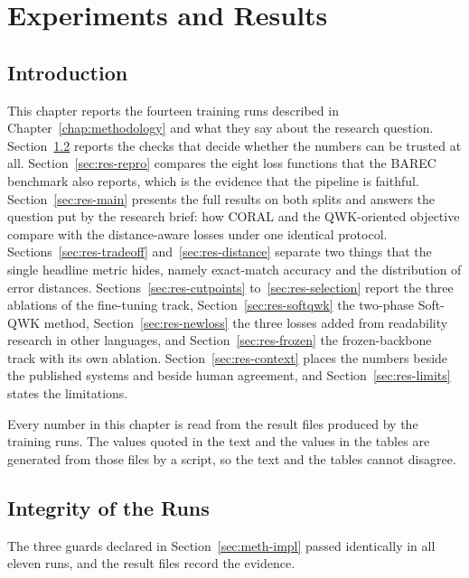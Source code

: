 \chapter{Experiments and Results}
\label{chap:results}

\section{Introduction}

This chapter reports the fourteen training runs described in Chapter~\ref{chap:methodology} and
what they say about the research question. Section~\ref{sec:res-integrity} reports the checks
that decide whether the numbers can be trusted at all. Section~\ref{sec:res-repro} compares the
eight loss functions that the BAREC benchmark also reports, which is the evidence that the
pipeline is faithful. Section~\ref{sec:res-main} presents the full results on both splits and
answers the question put by the research brief: how CORAL and the QWK-oriented objective
compare with the distance-aware losses under one identical protocol.
Sections~\ref{sec:res-tradeoff} and~\ref{sec:res-distance} separate two things that the single
headline metric hides, namely exact-match accuracy and the distribution of error distances.
Sections~\ref{sec:res-cutpoints} to~\ref{sec:res-selection} report the three ablations of the
fine-tuning track, Section~\ref{sec:res-softqwk} the two-phase Soft-QWK method,
Section~\ref{sec:res-newloss} the three losses added from readability research in other
languages, and Section~\ref{sec:res-frozen} the frozen-backbone track with its own ablation. Section~\ref{sec:res-context}
places the numbers beside the published systems and beside human agreement, and
Section~\ref{sec:res-limits} states the limitations.

Every number in this chapter is read from the result files produced by the training runs. The
values quoted in the text and the values in the tables are generated from those files by a
script, so the text and the tables cannot disagree.

\section{Integrity of the Runs}
\label{sec:res-integrity}

The three guards declared in Section~\ref{sec:meth-impl} passed identically in all eleven runs,
and the result files record the evidence.

